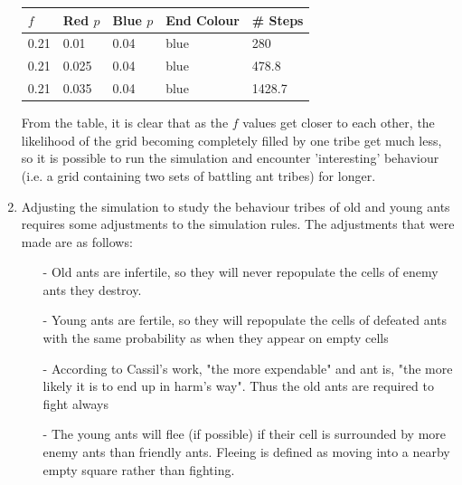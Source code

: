 \begin{enumerate}
\begin{center}
\begin{tabular}{|l|l|l|l|l|}
\hline
\textbf{$f$} & \textbf{Red $p$} & \textbf{Blue $p$} & \textbf{End Colour} & \# \textbf{Steps} \\ \hline
0.21 & 0.01 & 0.04 & blue & 280 \\ \hline
0.21 & 0.025 & 0.04 & blue & 478.8 \\ \hline
0.21 & 0.035 & 0.04 & blue & 1428.7 \\ \hline
\end{tabular}
\end{center}

From the table, it is clear that as the $f$ values get closer to each other, 
the likelihood of the grid becoming completely filled by one tribe get much 
less, so it is possible to run the simulation and encounter 'interesting' 
behaviour (i.e. a grid containing two sets of battling ant tribes) for longer.

\item Adjusting the simulation to study the behaviour tribes of old and young 
ants requires some adjustments to the simulation rules.  The adjustments that 
were made are as follows:

\begin{itemize}
\item[-]Old ants are infertile, so they will never repopulate the cells of 
enemy ants they destroy.
\item[-]Young ants are fertile, so they will repopulate the cells of defeated 
ants with the same probability as when they appear on empty cells
\item[-]According to Cassil's work, "the more expendable" and ant is, "the more 
likely it is to end up in harm's way".  Thus the old ants are required to fight 
always
\item[-]The young ants will flee (if possible) if their cell is surrounded by
more enemy ants than friendly ants.  Fleeing is defined as moving into a nearby 
empty square rather than fighting.
\end{itemize}

\end{enumerate}
